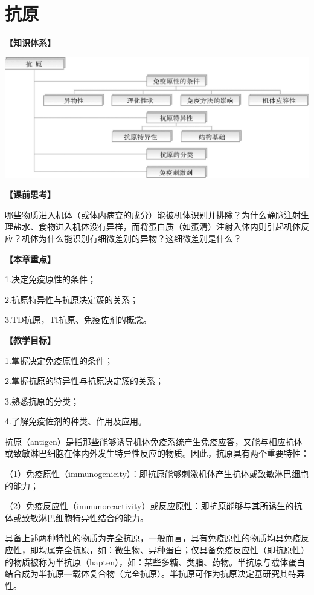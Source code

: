\chapter{抗原}
\begin{framed}
\noindent\textbf{【知识体系】}
\begin{center}
\includegraphics{./images/Image00049.jpg}
\end{center}
\noindent\textbf{【课前思考】}

哪些物质进入机体（或体内病变的成分）能被机体识别并排除？为什么静脉注射生理盐水、食物进入机体没有异样，而将蛋白质（如蛋清）注射入体内则引起机体反应？机体为什么能识别有细微差别的异物？这细微差别是什么？

\noindent\textbf{【本章重点】}

1.决定免疫原性的条件；

2.抗原特异性与抗原决定簇的关系；

3.TD抗原，TI抗原、免疫佐剂的概念。

\noindent\textbf{【教学目标】}

1.掌握决定免疫原性的条件；

2.掌握抗原的特异性与抗原决定簇的关系；

3.熟悉抗原的分类；

4.了解免疫佐剂的种类、作用及应用。
\end{framed}

抗原（antigen）是指那些能够诱导机体免疫系统产生免疫应答，又能与相应抗体或致敏淋巴细胞在体内外发生特异性反应的物质。因此，抗原具有两个重要特性：

（1）免疫原性（immunogenicity）：即抗原能够刺激机体产生抗体或致敏淋巴细胞的能力；

（2）免疫反应性（immunoreactivity）或反应原性：即抗原能够与其所诱生的抗体或致敏淋巴细胞特异性结合的能力。

具备上述两种特性的物质为完全抗原，一般而言，具有免疫原性的物质均具免疫反应性，即均属完全抗原，如：微生物、异种蛋白；仅具备免疫反应性（即抗原性）的物质被称为半抗原（hapten），如：某些多糖、类脂、药物。半抗原与载体蛋白结合成为半抗原---载体复合物（完全抗原）。半抗原可作为抗原决定基研究其特异性。

